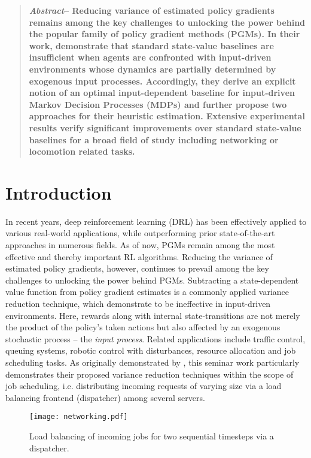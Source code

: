 \begin{abstract}
\textbf{
\textit{Abstract}-- Reducing variance of estimated policy gradients remains among the key challenges to unlocking the power behind the popular family of policy gradient methods (PGMs). In their work, \citeauthor{mao2018variance} \cite{mao2018variance} demonstrate that standard state-value baselines are insufficient when agents are confronted with input-driven environments whose dynamics are partially determined by exogenous input processes. Accordingly, they derive an explicit notion of an optimal input-dependent baseline for input-driven Markov Decision Processes (MDPs) and further propose two approaches for their heuristic estimation. Extensive experimental results verify significant improvements over standard state-value baselines for a broad field of study including networking or locomotion related tasks.
}
\end{abstract}


\section{Introduction}

In recent years, deep reinforcement learning (DRL) has been effectively applied to various real-world applications, while outperforming prior state-of-the-art approaches in numerous fields. As of now, PGMs remain among the most effective and thereby important RL algorithms. Reducing the variance of estimated policy gradients, however, continues to prevail among the key challenges to unlocking the power behind PGMs. Subtracting a state-dependent value function from policy gradient estimates is a commonly applied variance reduction technique, which \citeauthor{mao2018variance} demonstrate to be ineffective in input-driven environments. Here, rewards along with internal state-transitions are not merely the product of the policy's taken actions but also affected by an exogenous stochastic process -- the \textit{input process}. Related applications include traffic control, queuing systems, robotic control with disturbances, resource allocation and job scheduling tasks. As originally demonstrated by \citeauthor{mao2018variance}, this seminar work particularly demonstrates their proposed variance reduction techniques within the scope of job scheduling, i.e. distributing incoming requests of varying size via a load balancing frontend (dispatcher) among several servers.

\begin{figure*}[ht]
  \centering
    \texttt{[image: networking.pdf]}
  \caption{Load balancing of incoming jobs for two sequential timesteps via a dispatcher.}
  \label{fig:network}
\end{figure*}

